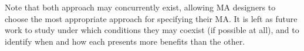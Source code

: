 Note that both approach may concurrently exist, allowing MA designers to choose
the most appropriate approach for specifying their MA. It is left as future work
to study under which conditions they may coexist (if possible at all), and to 
identify when and how each presents more benefits than the other.

